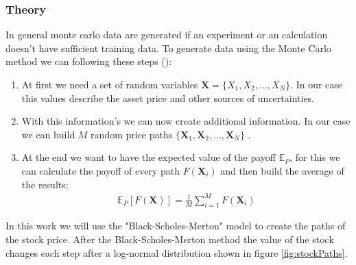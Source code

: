 \documentclass[a4paper, 12pt, one column, aas_macros]{article}
\begin{document}
\subsubsection{Theory} \label{sec:classic_mc_theory}
In general monte carlo data are generated if an experiment or an calculation doesn't have sufficient training data. To generate data using the Monte Carlo method we can following these steps (\cite{1905.02666}):
\begin{enumerate}
	\item At first we need a set of random variables $\textbf{X}=\{X_1, X_2, \dots, X_N\}$. In our case this values describe the asset price and other sources of uncertainties.
	\item With this information's we can now create additional information. In our case we can build $M$ random price paths $\{ \textbf{X}_1, \textbf{X}_2, \dots, \textbf{X}_N \}$ .
	\item At the end we want to have the expected value of the payoff $\mathbb{E}_P$, for this we can calculate the payoff of every path $F(\textbf{X}_i)$ and then build the average of the results:
	    \begin{align}
	        \mathbb{E}_P[F(\textbf{X})] = \frac{1}{M} \sum_{i=1}^{M} F(\textbf{X}_i)
	    \end{align}
\end{enumerate}

In this work we will use the "Black-Scholes-Merton" model to create the paths of the stock price. After the Black-Scholes-Merton method the value of the stock changes each step after a log-normal distribution shown in figure \ref{fig:stockPaths}.
\end{document}

